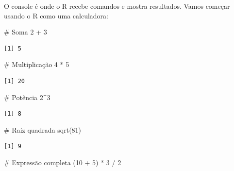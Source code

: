 \documentclass[
  letterpaper,
]{scrbook}
\newenvironment{Shaded}{\begin{snugshade}}{\end{snugshade}}
\newcommand{\CommentTok}[1]{\textcolor[rgb]{0.37,0.37,0.37}{#1}}
\newcommand{\DecValTok}[1]{\textcolor[rgb]{0.68,0.00,0.00}{#1}}
\newcommand{\FunctionTok}[1]{\textcolor[rgb]{0.28,0.35,0.67}{#1}}
\newcommand{\NormalTok}[1]{\textcolor[rgb]{0.00,0.23,0.31}{#1}}
\newcommand{\SpecialCharTok}[1]{\textcolor[rgb]{0.37,0.37,0.37}{#1}}
\begin{document}
O console é onde o R recebe comandos e mostra resultados. Vamos começar
usando o R como uma calculadora:

\begin{Shaded}
\begin{Highlighting}[]
\CommentTok{\# Soma}
\DecValTok{2} \SpecialCharTok{+} \DecValTok{3}
\end{Highlighting}
\end{Shaded}

\begin{verbatim}
[1] 5
\end{verbatim}

\begin{Shaded}
\begin{Highlighting}[]
\CommentTok{\# Multiplicação}
\DecValTok{4} \SpecialCharTok{*} \DecValTok{5}
\end{Highlighting}
\end{Shaded}

\begin{verbatim}
[1] 20
\end{verbatim}

\begin{Shaded}
\begin{Highlighting}[]
\CommentTok{\# Potência}
\DecValTok{2}\SpecialCharTok{\^{}}\DecValTok{3}
\end{Highlighting}
\end{Shaded}

\begin{verbatim}
[1] 8
\end{verbatim}

\begin{Shaded}
\begin{Highlighting}[]
\CommentTok{\# Raiz quadrada}
\FunctionTok{sqrt}\NormalTok{(}\DecValTok{81}\NormalTok{)}
\end{Highlighting}
\end{Shaded}

\begin{verbatim}
[1] 9
\end{verbatim}

\begin{Shaded}
\begin{Highlighting}[]
\CommentTok{\# Expressão completa}
\NormalTok{(}\DecValTok{10} \SpecialCharTok{+} \DecValTok{5}\NormalTok{) }\SpecialCharTok{*} \DecValTok{3} \SpecialCharTok{/} \DecValTok{2}
\end{Highlighting}
\end{Shaded}
\end{document}

